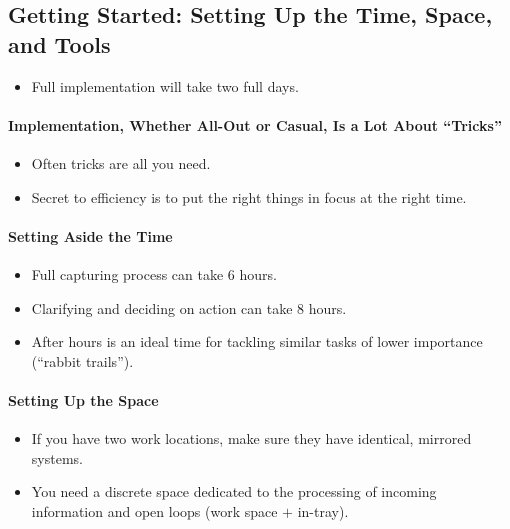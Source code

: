 \documentclass{article}
\begin{document}
\subsection{Getting Started: Setting Up the Time, Space, and Tools}

\begin{itemize}
  \item Full implementation will take two full days.
\end{itemize}

\paragraph{Implementation, Whether All-Out or Casual, Is a Lot About ``Tricks''}

\begin{itemize}
  \item Often tricks are all you need.
  \item Secret to efficiency is to put the right things in focus at the right time.
\end{itemize}

\paragraph{Setting Aside the Time}

\begin{itemize}
  \item Full capturing process can take 6 hours.
  \item Clarifying and deciding on action can take 8 hours.
  \item After hours is an ideal time for tackling similar tasks of lower importance (``rabbit trails'').
\end{itemize}

\paragraph{Setting Up the Space}

\begin{itemize}
  \item If you have two work locations, make sure they have identical, mirrored systems.
  \item You need a discrete space dedicated to the processing of incoming information and open loops (work space $+$ in-tray).
\end{itemize}
\end{document}
